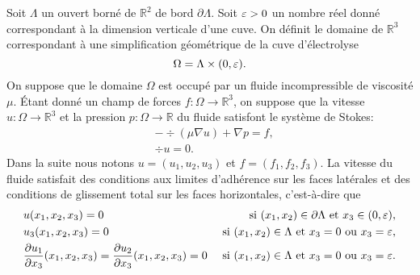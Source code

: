 Soit $\Lambda$ un ouvert borné de $\mathbb R^2$ de bord
$\partial\Lambda$. Soit $\varepsilon > 0$ un nombre réel donné
correspondant à la dimension verticale d'une cuve. On définit le
domaine de $\mathbb R^3$ correspondant à une simplification
géométrique de la cuve d'électrolyse
\begin{equation}
  \Omega = \Lambda \times (0,\varepsilon).
\end{equation}
On suppose que le domaine $\Omega$ est occupé par un fluide
incompressible de viscosité $\mu$. Étant donné un champ de forces
$f:\Omega\to \mathbb R^3$, on suppose que la vitesse $u:\Omega \to
\mathbb R^3$ et la pression $p:\Omega \to \mathbb R$ du fluide
satisfont le système de Stokes:
\begin{align}
  &- \div(\mu\nabla u) + \nabla p = f,\label{eq:stokes-u}\\
  &\div u = 0.\label{eq:stokes-p}
\end{align}
Dans la suite nous notons $u = (u_1, u_2, u_3)$ et $f = (f_1, f_2,
f_3)$. La vitesse du fluide satisfait des conditions aux limites
d'adhérence sur les faces latérales et des conditions de glissement
total sur les faces horizontales, c'est-à-dire que
\begin{align}
  &u(x_1, x_2, x_3) = 0 &\text{ si } (x_1, x_2) \in \partial \Lambda%
  \text{ et } x_3\in(0, \thickness),\label{eq:stokes-bc-1}\\
%
  &u_3(x_1, x_2, x_3) = 0 &\text{ si } (x_1, x_2) \in \Lambda \text{ et } x_3 = 0 \text{ ou } x_3 = \thickness,\label{eq:stokes-bc-2}\\
%
  &\frac{\partial u_1}{\partial x_3}(x_1, x_2, x_3) = \frac{\partial u_2}{\partial x_3}(x_1, x_2, x_3) = 0 &\text{ si }
  (x_1, x_2) \in \Lambda \text{ et } x_3 = 0 \text { ou } x_3 = \thickness.\label{eq:stokes-bc-3}
\end{align}

